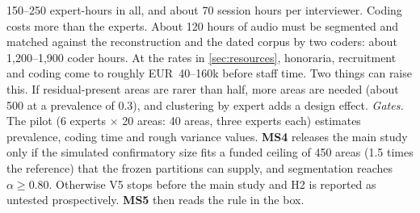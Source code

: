 150--250 expert-hours in all, and about 70 session hours per interviewer. \evint{} Coding costs
more than the experts. About 120 hours of audio must be segmented and matched against the
reconstruction and the dated corpus by two coders: about 1,200--1,900 coder hours. At the rates in
\cref{sec:resources}, honoraria, recruitment and coding come to roughly EUR~40--160k before staff
time. Two things can raise this. If residual-present areas are rarer than half, more areas are
needed (about 500 at a prevalence of 0.3), and clustering by expert adds a design effect.
\emph{Gates.} The pilot (6 experts $\times$ 20 areas: 40 areas, three experts each) estimates
prevalence, coding time and rough variance values. \textbf{MS4} releases the main study only if the
simulated confirmatory size fits a funded ceiling of 450 areas (1.5 times the reference) that the
frozen partitions can supply, and segmentation reaches $\alpha \geq 0.80$. Otherwise V5 stops before
the main study and H2 is reported as untested prospectively. \textbf{MS5} then reads the rule in the
box.

